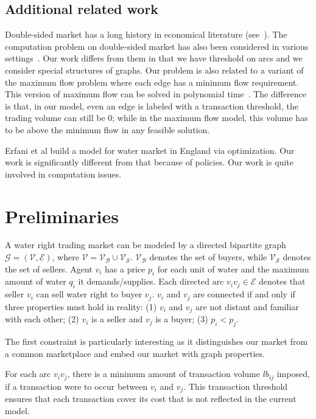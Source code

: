 \documentclass{aamas2015}
\begin{document}
\subsection{Additional related work}

Double-sided market has a long history in economical literature (see~\cite{Myerson83,Barbera1995}). The computation problem on double-sided market has also been considered in various settings~\cite{Kalagnanam00,Sandholm01,Sandholm02,Blume09}. Our work differs from them in that we have threshold on arcs and we consider special structures of graphs. Our problem is also related to a variant of the maximum flow problem where each edge has a minimum flow requirement. This version of maximum flow can be solved in polynomial time~\cite{ford2010flows}. The difference is that, in our model, even an edge is labeled with a transaction threshold, the trading volume can still be 0; while in the maximum flow model, this volume has to be above the minimum flow in any feasible solution.

Erfani et al\cite{erfani2014simulating} build a model for water market in England via optimization. Our work is significantly different from that because of policies. Our work is quite involved in computation issues. 
\section{Preliminaries}
A water right trading market can be modeled by a directed bipartite graph $\mathcal{G}=(\mathcal{V},\mathcal{E})$, where
$\mathcal{V}=\mathcal{V_B}\cup \mathcal{V_S}$.
$\mathcal{V_B}$ denotes the set of buyers, while $\mathcal{V_S}$ denotes the set of sellers.
Agent $v_i$ has a price $p_i$ for each unit of water and the maximum amount of water $q_i$ it demands/supplies. Each directed arc $v_iv_j\in \mathcal{E}$ denotes that seller $v_i$ can sell water right to buyer $v_j$. $v_i$ and $v_j$ are connected if and only if three properties must hold in reality:
(1) $v_i$ and $v_j$ are not distant and familiar with each other;
(2) $v_i$ is a seller and $v_j$ is a buyer;
(3) $p_i<p_j$.

The first constraint is particularly interesting as it distinguishes our market from a common marketplace and embed our market with graph properties.

For each arc $v_iv_j$, there is a minimum amount of transaction volume $lb_{ij}$ imposed, if a transaction were to occur between $v_i$ and $v_j$. This transaction threshold ensures that each transaction cover its cost that is not reflected in the current model.
\end{document}
